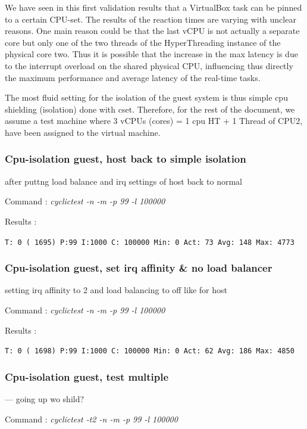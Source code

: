 \documentclass[]{scrartcl}
\begin{document}
We have seen in this first validation results that a VirtualBox task can be pinned to a certain CPU-set. The results of the reaction times are varying with unclear reasons. One main reason could be that the last vCPU is not actually a separate core but only one of the two threads of the HyperThreading instance of the physical core two. Thus it is possible that the increase in the max latency is due to the interrupt overload on the shared physical CPU, influencing thus directly the maximum performance and average latency of the real-time tasks.

The most fluid setting for the isolation of the guest system is thus simple cpu shielding (isolation) done with cset. Therefore, for the rest of the document, we assume a test machine where 3 vCPUs (cores) = 1 cpu HT + 1 Thread of CPU2, have been assigned to the virtual machine.

\subsubsection{Cpu-isolation guest, host back to simple isolation}

after puttng load balance and irq settings of host back to normal

\noindent Command : \textit{cyclictest -n -m -p 99 -l 100000}

\noindent Results :

\noindent \texttt{T: 0 ( 1695) P:99 I:1000 C: 100000 Min:      0 Act:   73 Avg:  148 Max:    4773}

\subsubsection{Cpu-isolation guest, set irq affinity \& no load balancer}

setting irq affinity to 2
and load balancing to off like for host

\noindent Command : \textit{cyclictest -n -m -p 99 -l 100000}

\noindent Results :

\noindent \texttt{T: 0 ( 1698) P:99 I:1000 C: 100000 Min:      0 Act:   62 Avg:  186 Max:    4850}

\subsubsection{Cpu-isolation guest, test multiple}

--- going up wo shild?

\noindent Command : \textit{cyclictest -t2 -n -m -p 99 -l 100000}
\end{document}
